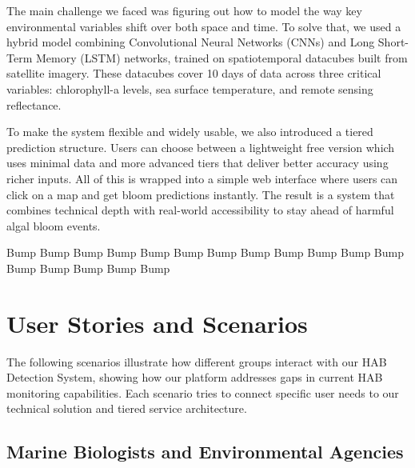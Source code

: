 \documentclass[conference]{IEEEtran}
\begin{document}
The main challenge we faced was figuring out how to model the way key environmental variables shift over both space and time. To solve that, we used a hybrid model combining Convolutional Neural Networks (CNNs) and Long Short-Term Memory (LSTM) networks, trained on spatiotemporal datacubes built from satellite imagery. These datacubes cover 10 days of data across three critical variables: chlorophyll-a levels, sea surface temperature, and remote sensing reflectance.

To make the system flexible and widely usable, we also introduced a tiered prediction structure. Users can choose between a lightweight free version which uses minimal data and more advanced tiers that deliver better accuracy using richer inputs. All of this is wrapped into a simple web interface where users can click on a map and get bloom predictions instantly. The result is a system that combines technical depth with real-world accessibility to stay ahead of harmful algal bloom events.

Bump
\newline
Bump
\newline
Bump
\newline
Bump
\newline
Bump
\newline
Bump
\newline
Bump
\newline
Bump
\newline
Bump
\newline
Bump
\newline
Bump
\newline
Bump
\newline
Bump
\newline
Bump
\newline
Bump
\newline
Bump
\newline
Bump

\section{User Stories and Scenarios}

The following scenarios illustrate how different groups interact with our HAB Detection System, showing how our platform addresses gaps in current HAB monitoring capabilities. Each scenario tries to connect specific user needs to our technical solution and tiered service architecture.

\subsection{Marine Biologists and Environmental Agencies}
\end{document}
